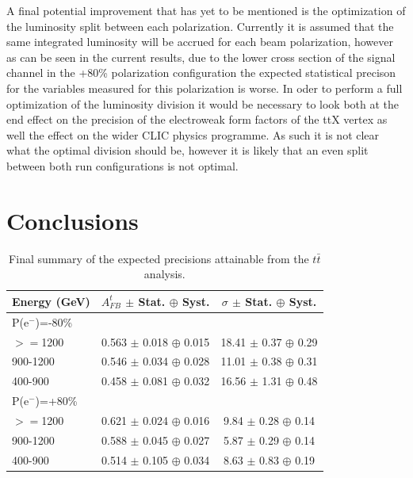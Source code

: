 A final potential improvement that has yet to be mentioned is the optimization of the luminosity split between each polarization. Currently it is assumed that the same integrated luminosity will be accrued for each beam polarization, however as can be seen in the current results, due to the lower cross section of the signal channel in the +80\% polarization configuration the expected statistical precison for the variables measured for this polarization is worse. In oder to perform a full optimization of the luminosity division it would be necessary to look both at the end effect on the precision of the electroweak form factors of the ttX vertex as well the effect on the wider \ac{CLIC} physics programme. As such it is not clear what the optimal division should be, however it is likely that an even split between both run configurations is not optimal.

\section{Conclusions}
\begin{table}[t]
  \centering
  \begin{tabular}{l|c|c}
    \toprule
    Energy (GeV) & $A_{FB}^t$ $\pm$ Stat. $\oplus$ Syst. & $\sigma$  $\pm$ Stat. $\oplus$ Syst.   \\
    \midrule
    \midrule
    \multicolumn{3}{l}{ P(e$^-$)=-80\%}\\
    \midrule
    $>=$1200   & 0.563 $\pm$ 0.018 $\oplus$ 0.015 & 18.41 $\pm$ 0.37 $\oplus$ 0.29\\
    \midrule
    900-1200   & 0.546 $\pm$ 0.034 $\oplus$ 0.028 & 11.01 $\pm$ 0.38 $\oplus$ 0.31\\
    \midrule
    400-900    & 0.458 $\pm$ 0.081 $\oplus$ 0.032 & 16.56 $\pm$ 1.31 $\oplus$ 0.48\\
    \midrule
    \midrule
    \multicolumn{3}{l}{ P(e$^-$)=+80\%}\\
    \midrule
    $>=$1200  & 0.621 $\pm$ 0.024 $\oplus$ 0.016 & 9.84 $\pm$ 0.28 $\oplus$ 0.14\\
    \midrule
    900-1200  & 0.588 $\pm$ 0.045 $\oplus$ 0.027 & 5.87 $\pm$ 0.29 $\oplus$ 0.14\\
    \midrule
    400-900   & 0.514 $\pm$ 0.105 $\oplus$ 0.034 & 8.63 $\pm$ 0.83 $\oplus$ 0.19\\
    \bottomrule
  \end{tabular}
  \caption{Final summary of the expected precisions attainable from the $t\bar{t}$ analysis.}
  \label{tab:conclusionnumbers}
\end{table}

